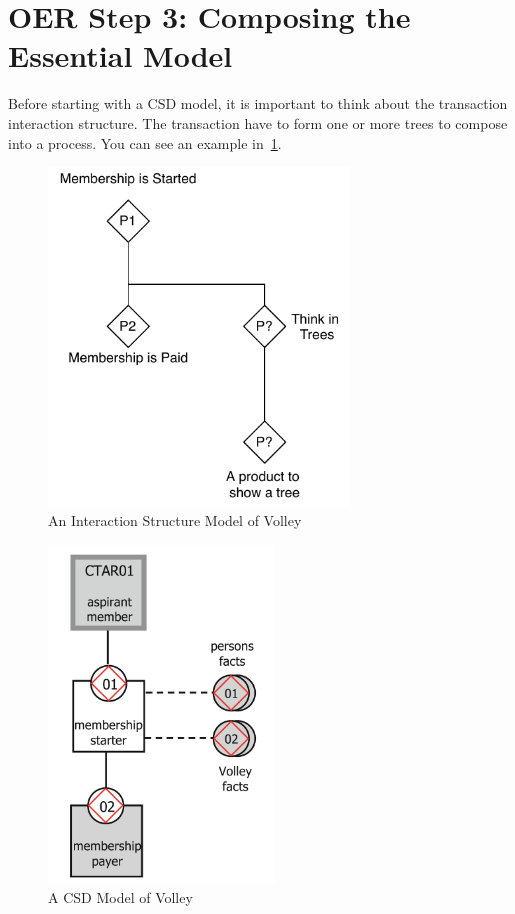 \section{OER Step 3: Composing the Essential Model}

Before starting with a CSD model, it is important to think about the transaction interaction structure. The transaction have to form one or more trees to compose into a process. You can see an example in~\cref{fig:interactionStructure}. 

\begin{figure}[h]\centering
	\includegraphics[width=8cm]{pic/VolleyInteractionStructure}
	\caption{An Interaction Structure Model of Volley}
	\label{fig:interactionStructure}
\end{figure}

\begin{figure}[h]\centering
	\includegraphics[width=6cm]{pic/VolleyCSD}
	\caption{A CSD Model of Volley~\cite{dietz2020enterprise}}
	\label{fig:csdModel}
\end{figure}

